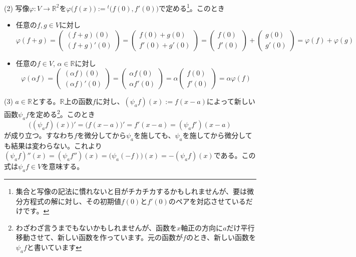 \noindent (2) 写像$\varphi\colon V\rightarrow \mathbb{R}^2$を$\varphi\bigl( f(x) \bigr) := {}^t \bigl( f(0), f'(0) \bigr)$で定める\footnote{集合と写像の記法に慣れないと目がチカチカするかもしれませんが、要は微分方程式の解に対し、その初期値$f(0)$と$f'(0)$のペアを対応させているだけです。}。このとき
\begin{itemize}
\item 任意の$f, g \in V$に対し
\[
\varphi(f + g) = \begin{pmatrix} (f + g)(0) \\ (f + g)' (0) \end{pmatrix} = \begin{pmatrix} f(0) + g(0) \\ f'(0) + g'(0) \end{pmatrix} = \begin{pmatrix} f(0) \\ f'(0) \end{pmatrix} + \begin{pmatrix} g(0) \\ g'(0) \end{pmatrix} = \varphi(f) + \varphi(g)
\]
\item 任意の$f \in V$, $\alpha \in \mathbb{R}$に対し
\[
\varphi(\alpha f) = \begin{pmatrix} (\alpha f)(0) \\ (\alpha f)'(0) \end{pmatrix} = \begin{pmatrix} \alpha f(0) \\ \alpha f'(0) \end{pmatrix} = \alpha \begin{pmatrix} f(0) \\ f'(0) \end{pmatrix} = \alpha \varphi(f)
\]
\end{itemize}


\noindent (3) $a\in\mathbb{R}$とする。$\mathbb{R}$上の函数$f$に対し、$(\psi_a  f)(x) := f(x-a)$によって新しい函数$\psi_a f$を定める\footnote{わざわざ言うまでもないかもしれませんが、函数を$x$軸正の方向に$a$だけ平行移動させて、新しい函数を作っています。元の函数が$f$のとき、新しい函数を$\psi_a f$と書いています}。このとき
\[
\bigl((\psi_a f)(x)\bigr)' = \bigl( f(x - a) \bigr)' = f' (x - a) = (\psi_a f')(x - a)
\]
が成り立つ。すなわち$f$を微分してから$\psi_a$を施しても、$\psi_a$を施してから微分しても結果は変わらない。これより$(\psi_a f)''(x) = (\psi_a f'')(x) = \bigl(\psi_a (-f)\bigr)(x) = - (\psi_a f)(x)$である。この式は$\psi_a f\in V$を意味する。

